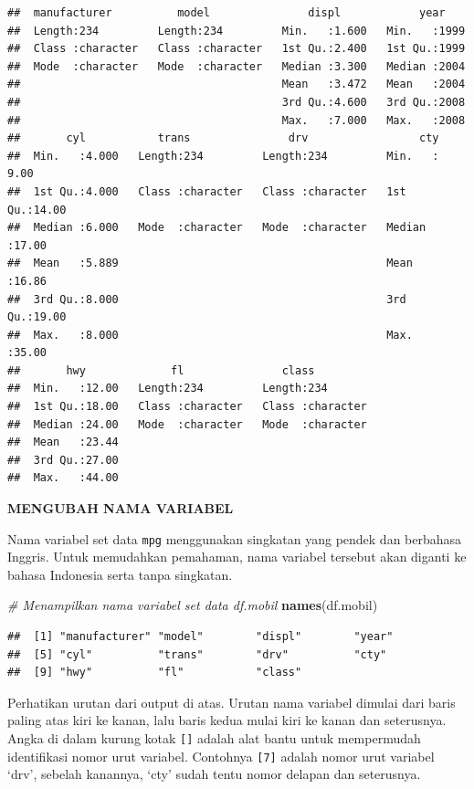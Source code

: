 \documentclass[openany]{book}
\newenvironment{Shaded}{\begin{snugshade}}{\end{snugshade}}
\newcommand{\KeywordTok}[1]{\textcolor[rgb]{0.13,0.29,0.53}{\textbf{#1}}}
\newcommand{\CommentTok}[1]{\textcolor[rgb]{0.56,0.35,0.01}{\textit{#1}}}
\newcommand{\NormalTok}[1]{#1}
\begin{document}
\begin{verbatim}
##  manufacturer          model               displ            year     
##  Length:234         Length:234         Min.   :1.600   Min.   :1999  
##  Class :character   Class :character   1st Qu.:2.400   1st Qu.:1999  
##  Mode  :character   Mode  :character   Median :3.300   Median :2004  
##                                        Mean   :3.472   Mean   :2004  
##                                        3rd Qu.:4.600   3rd Qu.:2008  
##                                        Max.   :7.000   Max.   :2008  
##       cyl           trans               drv                 cty       
##  Min.   :4.000   Length:234         Length:234         Min.   : 9.00  
##  1st Qu.:4.000   Class :character   Class :character   1st Qu.:14.00  
##  Median :6.000   Mode  :character   Mode  :character   Median :17.00  
##  Mean   :5.889                                         Mean   :16.86  
##  3rd Qu.:8.000                                         3rd Qu.:19.00  
##  Max.   :8.000                                         Max.   :35.00  
##       hwy             fl               class          
##  Min.   :12.00   Length:234         Length:234        
##  1st Qu.:18.00   Class :character   Class :character  
##  Median :24.00   Mode  :character   Mode  :character  
##  Mean   :23.44                                        
##  3rd Qu.:27.00                                        
##  Max.   :44.00
\end{verbatim}

\textbf{MENGUBAH NAMA VARIABEL}

Nama variabel set data \texttt{mpg} menggunakan singkatan yang pendek
dan berbahasa Inggris. Untuk memudahkan pemahaman, nama variabel
tersebut akan diganti ke bahasa Indonesia serta tanpa singkatan.

\begin{Shaded}
\begin{Highlighting}[]
\CommentTok{# Menampilkan nama variabel set data df.mobil}
\KeywordTok{names}\NormalTok{(df.mobil)}
\end{Highlighting}
\end{Shaded}

\begin{verbatim}
##  [1] "manufacturer" "model"        "displ"        "year"        
##  [5] "cyl"          "trans"        "drv"          "cty"         
##  [9] "hwy"          "fl"           "class"
\end{verbatim}

Perhatikan urutan dari output di atas. Urutan nama variabel dimulai dari
baris paling atas kiri ke kanan, lalu baris kedua mulai kiri ke kanan
dan seterusnya. Angka di dalam kurung kotak \texttt{{[}{]}} adalah alat
bantu untuk mempermudah identifikasi nomor urut variabel. Contohnya
\texttt{{[}7{]}} adalah nomor urut variabel `drv', sebelah kanannya,
`cty' sudah tentu nomor delapan dan seterusnya.
\end{document}
